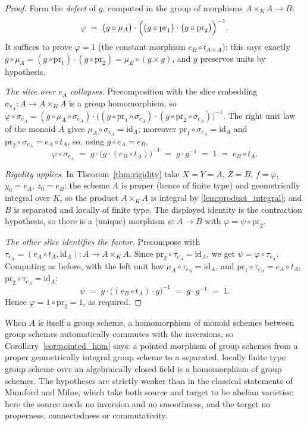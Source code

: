 \begin{proof}
  \leanok
  Form the \emph{defect} of \(g\), computed in the group of morphisms
  \(A \times_K A \to B\):
  \[
    \varphi \;=\; \bigl(g \circ \mu_A\bigr) \cdot
      \Bigl(\bigl(g \circ \mathrm{pr}_1\bigr) \cdot \bigl(g \circ \mathrm{pr}_2\bigr)\Bigr)^{-1}.
  \]
  It suffices to prove \(\varphi = 1\) (the constant morphism \(e_B \circ t_{A \times A}\)):
  this says exactly \(g \circ \mu_A = (g \circ \mathrm{pr}_1) \cdot (g \circ \mathrm{pr}_2)
  = \mu_B \circ (g \times g)\), and \(g\) preserves units by hypothesis.

  \emph{The slice over \(e_A\) collapses.} Precomposition with the slice embedding
  \(\sigma_{e_A} : A \to A \times_K A\) is a group homomorphism, so
  \(\varphi \circ \sigma_{e_A} = (g \circ \mu_A \circ \sigma_{e_A}) \cdot
  \bigl((g \circ \mathrm{pr}_1 \circ \sigma_{e_A}) \cdot
  (g \circ \mathrm{pr}_2 \circ \sigma_{e_A})\bigr)^{-1}\). The right unit law of the monoid
  \(A\) gives \(\mu_A \circ \sigma_{e_A} = \mathrm{id}_A\); moreover
  \(\mathrm{pr}_1 \circ \sigma_{e_A} = \mathrm{id}_A\) and
  \(\mathrm{pr}_2 \circ \sigma_{e_A} = e_A \circ t_A\), so, using
  \(g \circ e_A = e_B\),
  \[
    \varphi \circ \sigma_{e_A}
      \;=\; g \cdot \bigl(g \cdot (e_B \circ t_A)\bigr)^{-1}
      \;=\; g \cdot g^{-1}
      \;=\; 1
      \;=\; e_B \circ t_A .
  \]

  \emph{Rigidity applies.} In Theorem~\ref{thm:rigidity} take \(X = Y = A\), \(Z = B\),
  \(f = \varphi\), \(y_0 = e_A\), \(z_0 = e_B\): the scheme \(A\) is proper (hence of finite
  type) and geometrically integral over \(K\), so the product \(A \times_K A\) is integral by
  \ref{lem:product_integral}; and \(B\) is separated and locally of finite type. The
  displayed identity is the contraction hypothesis, so there is a (unique) morphism
  \(\psi : A \to B\) with \(\varphi = \psi \circ \mathrm{pr}_2\).

  \emph{The other slice identifies the factor.} Precompose with
  \(\tau_{e_A} = (e_A \circ t_A, \mathrm{id}_A) : A \to A \times_K A\). Since
  \(\mathrm{pr}_2 \circ \tau_{e_A} = \mathrm{id}_A\), we get
  \(\psi = \varphi \circ \tau_{e_A}\). Computing as before, with the left unit law
  \(\mu_A \circ \tau_{e_A} = \mathrm{id}_A\), and
  \(\mathrm{pr}_1 \circ \tau_{e_A} = e_A \circ t_A\),
  \(\mathrm{pr}_2 \circ \tau_{e_A} = \mathrm{id}_A\):
  \[
    \psi \;=\; g \cdot \bigl((e_B \circ t_A) \cdot g\bigr)^{-1}
        \;=\; g \cdot g^{-1} \;=\; 1 .
  \]
  Hence \(\varphi = 1 \circ \mathrm{pr}_2 = 1\), as required.
\end{proof}

When \(A\) is itself a group scheme, a homomorphism of monoid schemes between group schemes
automatically commutes with the inversions, so Corollary~\ref{cor:pointed_hom} says: a
pointed morphism of group schemes from a proper geometrically integral group scheme to a
separated, locally finite type group scheme over an algebraically closed field is a
homomorphism of group schemes. The hypotheses are strictly weaker than in the classical
statements of Mumford and Milne, which take both source and target to be abelian varieties:
here the source needs no inversion and no smoothness, and the target no properness,
connectedness or commutativity.
